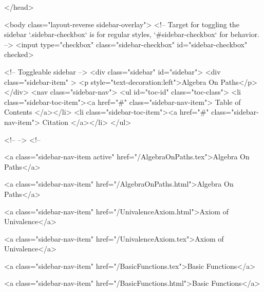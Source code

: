   
</head>




  <body class="layout-reverse sidebar-overlay">
    <!-- Target for toggling the sidebar `.sidebar-checkbox` is for regular
     styles, `#sidebar-checkbox` for behavior. -->
<input type="checkbox" class="sidebar-checkbox" id="sidebar-checkbox" checked>

<!-- Toggleable sidebar -->
<div class="sidebar" id="sidebar">
  <div class="sidebar-item" >
    <p style="text-decoration:left">Algebra On Paths</p>
  </div>
  <nav class="sidebar-nav">
    <ul id="toc-id" class="toc-class">
  <li class="sidebar-toc-item"><a href="#" class="sidebar-nav-item"> Table of Contents </a></li>
  <li class="sidebar-toc-item"><a href="#" class="sidebar-nav-item"> Citation </a></li>
</ul>


    <!--  -->
    <!-- 
      
    
      
    
      
    
      
        
      
    
      
        
          <a class="sidebar-nav-item active" href="/AlgebraOnPaths.tex">Algebra On Paths</a>
        
      
    
      
        
          <a class="sidebar-nav-item" href="/AlgebraOnPaths.html">Algebra On Paths</a>
        
      
    
      
        
          <a class="sidebar-nav-item" href="/UnivalenceAxiom.html">Axiom of Univalence</a>
        
      
    
      
        
          <a class="sidebar-nav-item" href="/UnivalenceAxiom.tex">Axiom of Univalence</a>
        
      
    
      
        
          <a class="sidebar-nav-item" href="/BasicFunctions.tex">Basic Functions</a>
        
      
    
      
        
          <a class="sidebar-nav-item" href="/BasicFunctions.html">Basic Functions</a>
        
      
    
